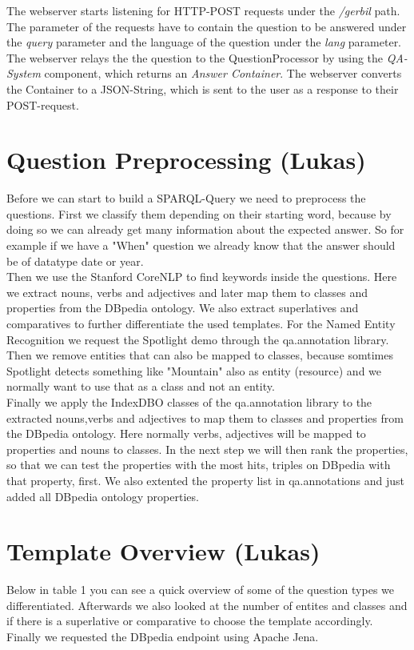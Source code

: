 \documentclass[runningheads]{llncs}
\begin{document}
The webserver starts listening for HTTP-POST requests under the \emph{/gerbil} path. The parameter of the requests have to contain the question to be answered under the \emph{query} parameter and the language of the question under the \emph{lang} parameter. \\

The webserver relays the the question to the QuestionProcessor by using the \emph{QA-System} component, which returns an \emph{Answer Container}. The webserver converts the Container to a JSON-String, which is sent to the user as a response to their POST-request.

\section{Question Preprocessing (Lukas)} 
Before we can start to build a SPARQL-Query we need to preprocess the questions. First we classify them depending on their starting word, because by doing so we can already get many information about the expected answer. So for example if we have a "When" question we already know that the answer should be of datatype date or year. \\

Then we use the Stanford CoreNLP \cite{stanford} to find keywords inside the questions. Here we extract nouns, verbs and adjectives and later map them to classes and properties from the DBpedia ontology. We also extract superlatives and comparatives to further differentiate the used templates. For the Named Entity Recognition we request the Spotlight \cite{spotlight} demo through the qa.annotation library. Then we remove entities that can also be mapped to classes, because somtimes Spotlight detects something like "Mountain" also as entity (resource) and we normally want to use that as a class and not an entity. \\

Finally we apply the IndexDBO classes of the qa.annotation library to the extracted nouns,verbs and adjectives to map them to classes and properties from the DBpedia ontology. Here normally verbs, adjectives will be mapped
to properties and nouns to classes. In the next step we will then rank the properties, so that we can test the properties with the most hits, triples on DBpedia with that property, first. We also extented the property list in qa.annotations and just added all DBpedia ontology properties.

\section{Template Overview (Lukas)}
Below in table 1 you can see a quick overview of some of the question types we differentiated. Afterwards we also looked at the number of entites and classes and if there is a superlative or comparative to choose the template accordingly. Finally we requested the DBpedia endpoint using Apache Jena.
\end{document}
